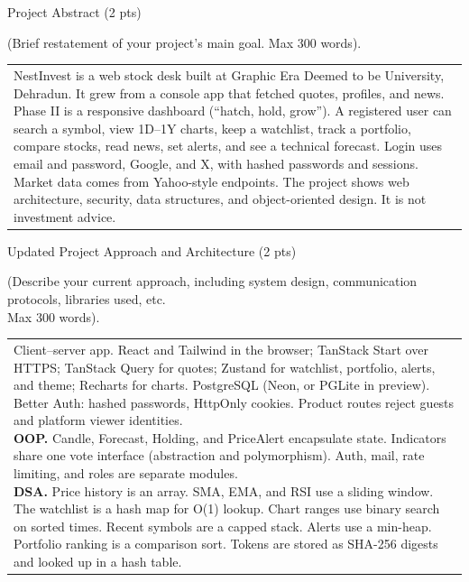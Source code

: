 \documentclass[12pt,a4paper]{article}
\newcommand{\sectiontitle}[1]{%
    {\color{GEUBlue}
    \fontsize{18}{22}\selectfont #1}
}
\newcommand{\instruction}[1]{%
    {\color{InstructionGrey}
    \fontsize{10.5}{13}\selectfont #1}
}
\newcommand{\answerbox}[2]{%
    \begin{tabularx}{\textwidth}{
        |>{\raggedright\arraybackslash}X|}
        \hline
        \parbox[t][#1][t]{\dimexpr\linewidth-12pt\relax}{
            \vspace{5pt}
            \fontsize{11}{13}\selectfont #2
        }\\
        \hline
    \end{tabularx}
}
\begin{document}
\vspace{0.70cm}

\sectiontitle{Project Abstract (2 pts)}

\vspace{0.05cm}

\instruction{
(Brief restatement of your project's main goal. Max 300 words).
}

\vspace{0.12cm}

\answerbox{3.60cm}{NestInvest is a web stock desk built at Graphic Era Deemed to be University, Dehradun. It grew from a console app that fetched quotes, profiles, and news. Phase II is a responsive dashboard (``hatch, hold, grow''). A registered user can search a symbol, view 1D--1Y charts, keep a watchlist, track a portfolio, compare stocks, read news, set alerts, and see a technical forecast. Login uses email and password, Google, and X, with hashed passwords and sessions. Market data comes from Yahoo-style endpoints. The project shows web architecture, security, data structures, and object-oriented design. It is not investment advice.}

\vspace{0.70cm}

\sectiontitle{Updated Project Approach and Architecture (2 pts)}

\vspace{0.05cm}

\instruction{
(Describe your current approach, including system design,
communication protocols, libraries used, etc.\\
Max 300 words).
}

\vspace{0.25cm}

\answerbox{4.75cm}{Client--server app. React and Tailwind in the browser; TanStack Start over HTTPS; TanStack Query for quotes; Zustand for watchlist, portfolio, alerts, and theme; Recharts for charts. PostgreSQL (Neon, or PGLite in preview). Better Auth: hashed passwords, HttpOnly cookies. Product routes reject guests and platform viewer identities.\\[2pt]
\textbf{OOP.} Candle, Forecast, Holding, and PriceAlert encapsulate state. Indicators share one vote interface (abstraction and polymorphism). Auth, mail, rate limiting, and roles are separate modules.\\[2pt]
\textbf{DSA.} Price history is an array. SMA, EMA, and RSI use a sliding window. The watchlist is a hash map for O(1) lookup. Chart ranges use binary search on sorted times. Recent symbols are a capped stack. Alerts use a min-heap. Portfolio ranking is a comparison sort. Tokens are stored as SHA-256 digests and looked up in a hash table.}
\end{document}
